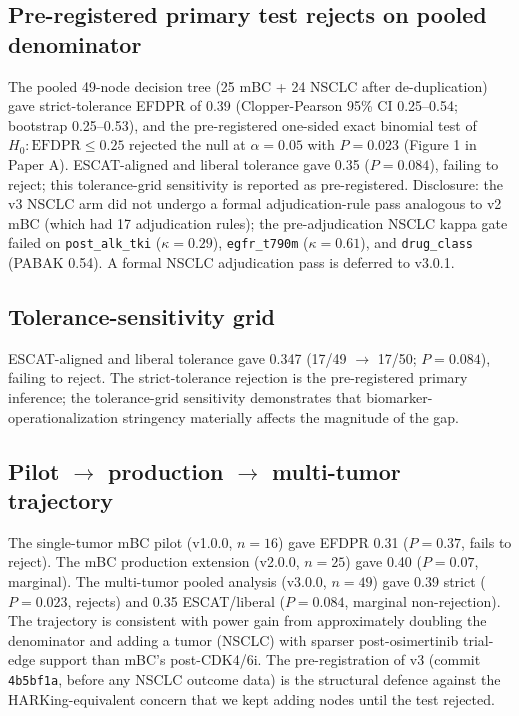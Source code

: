 \documentclass[11pt,a4paper]{article}
\begin{document}
\subsection{Pre-registered primary test rejects on pooled denominator}
The pooled 49-node decision tree (25 mBC + 24 NSCLC after de-duplication) gave strict-tolerance EFDPR of 0.39 (Clopper-Pearson 95\% CI 0.25--0.54; bootstrap 0.25--0.53), and the pre-registered one-sided exact binomial test of $H_0: \mathrm{EFDPR} \le 0.25$ rejected the null at $\alpha = 0.05$ with $P = 0.023$ (Figure 1 in Paper A). ESCAT-aligned and liberal tolerance gave 0.35 ($P = 0.084$), failing to reject; this tolerance-grid sensitivity is reported as pre-registered. Disclosure: the v3 NSCLC arm did not undergo a formal adjudication-rule pass analogous to v2 mBC (which had 17 adjudication rules); the pre-adjudication NSCLC kappa gate failed on \texttt{post\_alk\_tki} ($\kappa = 0.29$), \texttt{egfr\_t790m} ($\kappa = 0.61$), and \texttt{drug\_class} (PABAK 0.54). A formal NSCLC adjudication pass is deferred to v3.0.1.

\subsection{Tolerance-sensitivity grid}
ESCAT-aligned and liberal tolerance gave 0.347 (17/49 $\to$ 17/50; $P = 0.084$), failing to reject. The strict-tolerance rejection is the pre-registered primary inference; the tolerance-grid sensitivity demonstrates that biomarker-operationalization stringency materially affects the magnitude of the gap.

\subsection{Pilot $\to$ production $\to$ multi-tumor trajectory}
The single-tumor mBC pilot (v1.0.0, $n = 16$) gave EFDPR 0.31 ($P = 0.37$, fails to reject). The mBC production extension (v2.0.0, $n = 25$) gave 0.40 ($P = 0.07$, marginal). The multi-tumor pooled analysis (v3.0.0, $n = 49$) gave 0.39 strict ($P = 0.023$, rejects) and 0.35 ESCAT/liberal ($P = 0.084$, marginal non-rejection). The trajectory is consistent with power gain from approximately doubling the denominator and adding a tumor (NSCLC) with sparser post-osimertinib trial-edge support than mBC's post-CDK4/6i. The pre-registration of v3 (commit \texttt{4b5bf1a}, before any NSCLC outcome data) is the structural defence against the HARKing-equivalent concern that we kept adding nodes until the test rejected.
\end{document}
